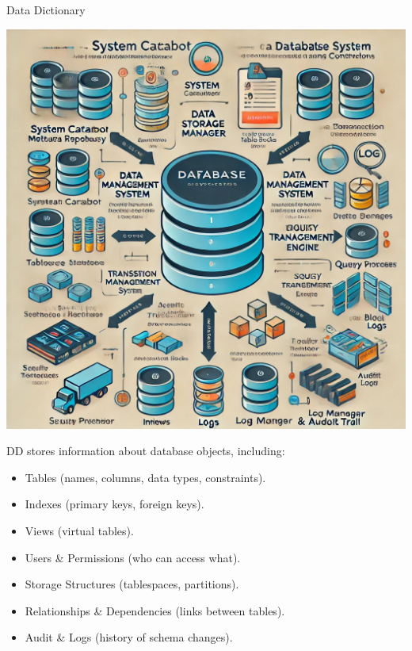 \documentclass{beamer}
\begin{document}
\begin{frame}{Data Dictionary}
    \small
    \begin{minipage}{.40\textwidth}
        \includegraphics[width=\textwidth]{figures/dd}
    \end{minipage}\hfill
    \begin{minipage}{.55\textwidth}
        \tiny
        DD stores information about database objects, including:
        \begin{itemize}
            \item Tables (names, columns, data types, constraints). \pause
            \item Indexes (primary keys, foreign keys). \pause
            \item Views (virtual tables). \pause
            \item Users \& Permissions (who can access what). \pause
            \item Storage Structures (tablespaces, partitions). \pause
            \item Relationships \& Dependencies (links between tables). \pause
            \item Audit \& Logs (history of schema changes).
        \end{itemize}
    \end{minipage}
\end{frame}
\end{document}
